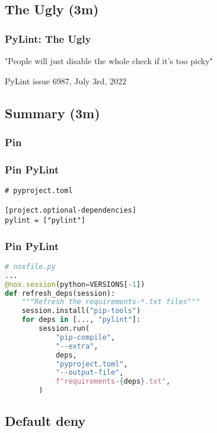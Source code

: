 \hypertarget{the-ugly-3m}{%
\subsection{The Ugly (3m)}\label{the-ugly-3m}}

\begin{frame}[fragile]
\frametitle{PyLint: The Ugly}

"People will just disable the whole check if it's too picky"

PyLint issue 6987, July 3rd, 2022

\end{frame}

\hypertarget{summary-3m}{%
\subsection{Summary (3m)}\label{summary-3m}}

\hypertarget{pin}{%
\subsubsection{Pin}\label{pin}}

\begin{frame}[fragile]
\frametitle{Pin PyLint}

\begin{lstlisting}
# pyproject.toml

[project.optional-dependencies]
pylint = ["pylint"]
\end{lstlisting}

\end{frame}

\begin{frame}[fragile]
\frametitle{Pin PyLint}

\begin{lstlisting}[language=Python]
# noxfile.py
...
@nox.session(python=VERSIONS[-1])
def refresh_deps(session):
    """Refresh the requirements-*.txt files"""
    session.install("pip-tools")
    for deps in [..., "pylint"]:
        session.run(
            "pip-compile",
            "--extra",
            deps,
            "pyproject.toml",
            "--output-file",
            f"requirements-{deps}.txt",
        )
\end{lstlisting}

\end{frame}

\hypertarget{default-deny}{%
\subsection{Default deny}\label{default-deny}}

